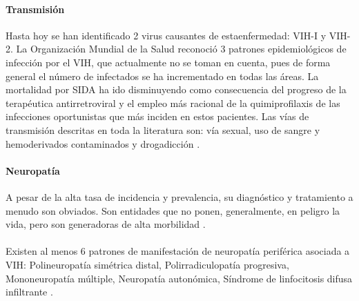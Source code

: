 \documentclass[a4paper,twocolumn,10pt]{article}
\begin{document}
\paragraph{Transmisión}
Hasta hoy se han identificado 2 virus causantes de estaenfermedad: VIH-I y VIH-2. La Organización Mundial de la Salud reconoció 3 patrones epidemiológicos de infección por el VIH, que actualmente no se toman en cuenta, pues de forma general el número de infectados se ha incrementado en todas las áreas. La mortalidad por SIDA ha ido disminuyendo como consecuencia del progreso de la terapéutica antirretroviral y el empleo más racional de la quimiprofilaxis de las infecciones oportunistas que más inciden en estos pacientes. Las vías de transmisión descritas en toda la literatura son: vía sexual, uso de sangre y hemoderivados contaminados  y drogadicción \cite{Castillo2004}.
\paragraph{Neuropatía} 
A pesar de la alta tasa de incidencia y prevalencia, su diagnóstico y tratamiento a menudo son obviados. Son entidades que no ponen, generalmente, en peligro la vida, pero son generadoras de alta morbilidad \cite{Ferri2002}. \\ \\
Existen al menos 6 patrones de manifestación de neuropatía periférica asociada a VIH: Polineuropatía simétrica distal, Polirradiculopatía progresiva, Mononeuropatía múltiple, Neuropatía autonómica, Síndrome de linfocitosis difusa infiltrante \cite{Ferri2002}.
\end{document}
